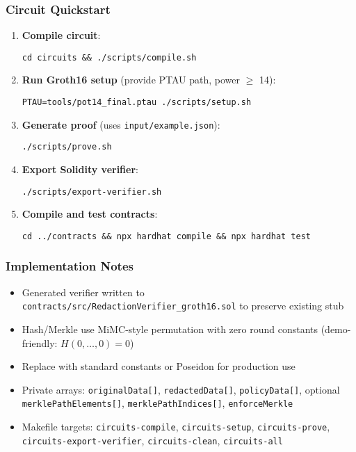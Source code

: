 \subsubsection{Circuit Quickstart}

\begin{enumerate}
    \item \textbf{Compile circuit}:
    \begin{verbatim}
cd circuits && ./scripts/compile.sh
    \end{verbatim}
    
    \item \textbf{Run Groth16 setup} (provide PTAU path, power $\geq$ 14):
    \begin{verbatim}
PTAU=tools/pot14_final.ptau ./scripts/setup.sh
    \end{verbatim}
    
    \item \textbf{Generate proof} (uses \texttt{input/example.json}):
    \begin{verbatim}
./scripts/prove.sh
    \end{verbatim}
    
    \item \textbf{Export Solidity verifier}:
    \begin{verbatim}
./scripts/export-verifier.sh
    \end{verbatim}
    
    \item \textbf{Compile and test contracts}:
    \begin{verbatim}
cd ../contracts && npx hardhat compile && npx hardhat test
    \end{verbatim}
\end{enumerate}

\subsubsection{Implementation Notes}

\begin{itemize}
    \item Generated verifier written to \texttt{contracts/src/RedactionVerifier\_groth16.sol} to preserve existing stub
    \item Hash/Merkle use MiMC-style permutation with zero round constants (demo-friendly: $H(0,\ldots,0)=0$)
    \item Replace with standard constants or Poseidon for production use
    \item Private arrays: \texttt{originalData[]}, \texttt{redactedData[]}, \texttt{policyData[]}, optional \texttt{merklePathElements[]}, \texttt{merklePathIndices[]}, \texttt{enforceMerkle}
    \item Makefile targets: \texttt{circuits-compile}, \texttt{circuits-setup}, \texttt{circuits-prove}, \texttt{circuits-export-verifier}, \texttt{circuits-clean}, \texttt{circuits-all}
\end{itemize}

